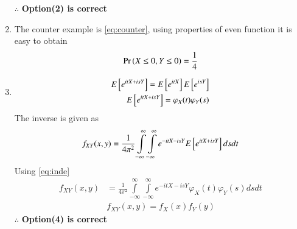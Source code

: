 \documentclass[journal,12pt,twocolumn]{IEEEtran}
\begin{document}
\begin{enumerate}
$\therefore$ \textbf{Option(2) is correct}
\item
The counter example is \eqref{eq:counter}, using properties of even function it is easy to obtain
\begin{align}
\Pr\left(X\le 0, Y\le0\right)=\frac{1}{4}
\end{align}
\item
\begin{align}
E{}\left[e^{itX+isY}\right]=E{}\left[e^{itX}\right]E{}\left[e^{isY}\right]\\
E{}\left[e^{itX+isY}\right]=\varphi_X(t)\varphi_Y(s) \label{eq:inde}
\end{align}
The inverse is given as
\begin{align}
f_{XY}(x,y)=\frac{1}{4\pi^2}\displaystyle \int\limits_{-\infty}^{\infty} \int\limits_{-\infty}^{\infty} e^{-itX-isY}E{}\left[e^{itX+isY}\right]ds dt
\end{align}
Using \eqref{eq:inde}
\begin{align}
f_{XY}(x,y)&=\frac{1}{4\pi^2}\displaystyle \int\limits_{-\infty}^{\infty} \int\limits_{-\infty}^{\infty} e^{-itX-isY}\varphi_X(t)\varphi_Y(s) ds dt\\
&f_{XY}(x,y)=f_X(x)f_Y(y)
\end{align}
$\therefore$ \textbf{Option(4) is correct}
\end{enumerate}
\end{document}
